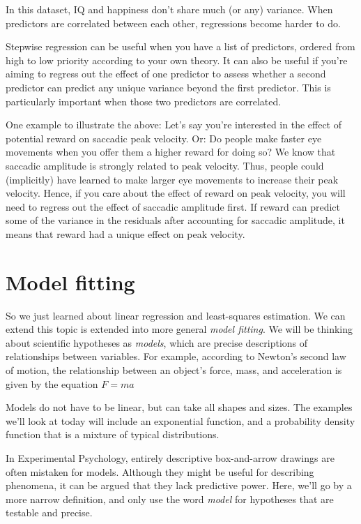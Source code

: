 \documentclass[11pt]{article}
\begin{document}
In this dataset, IQ and happiness don't share much (or any) variance.
When predictors are correlated between each other, regressions become
harder to do.

Stepwise regression can be useful when you have a list of predictors,
ordered from high to low priority according to your own theory. It can
also be useful if you're aiming to regress out the effect of one
predictor to assess whether a second predictor can predict any unique
variance beyond the first predictor. This is particularly important when
those two predictors are correlated.

One example to illustrate the above: Let's say you're interested in the
effect of potential reward on saccadic peak velocity. Or: Do people make
faster eye movements when you offer them a higher reward for doing so?
We know that saccadic amplitude is strongly related to peak velocity.
Thus, people could (implicitly) have learned to make larger eye
movements to increase their peak velocity. Hence, if you care about the
effect of reward on peak velocity, you will need to regress out the
effect of saccadic amplitude first. If reward can predict some of the
variance in the residuals after accounting for saccadic amplitude, it
means that reward had a unique effect on peak velocity.

    \section{Model fitting}\label{model-fitting}

So we just learned about linear regression and least-squares estimation.
We can extend this topic is extended into more general \emph{model
fitting}. We will be thinking about scientific hypotheses as
\emph{models}, which are precise descriptions of relationships between
variables. For example, according to Newton's second law of motion, the
relationship between an object's force, mass, and acceleration is given
by the equation \(F = ma\)

Models do not have to be linear, but can take all shapes and sizes. The
examples we'll look at today will include an exponential function, and a
probability density function that is a mixture of typical distributions.

In Experimental Psychology, entirely descriptive box-and-arrow drawings
are often mistaken for models. Although they might be useful for
describing phenomena, it can be argued that they lack predictive power.
Here, we'll go by a more narrow definition, and only use the word
\emph{model} for hypotheses that are testable and precise.
\end{document}
